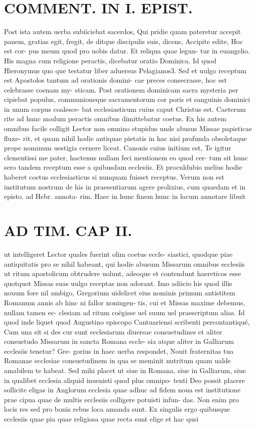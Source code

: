 \documentclass{article}
\begin{document}
\begin{pages}
\section*{COMMENT. IN I. EPIST. }\pstart Post ista autem uerba subiiciebat sacerdos, Qui pridie quam pateretur accepit panem, gratias egit, fregit, de ditque discipulis suis, dicens, Accipite edite, Hoc est cor- pus meum quod pro uobis datur. Et reliqua quae legun- tur in euangelio. His magna cum religione peractis, dicebatur oratio Dominica. Id quod Hieronymus quo que testatur liber  aduersus Pelagianos3. Sed et uulgo receptum est Apostolos tantum ad orationis domini- cae preces consecrasse, hoc est celebrasse coenam my- sticam. Post orationem dominicam sacra mysteria per cipiebat populus, communioneque sacramentorum cor poris et sanguinis dominici in unum corpus coalesce- bat ecclesiasticum cuius caput Christus est. Caeterum rite ad hunc modum peractis omnibus dimittebatur coetus. Ex his autem omnibus facile colligit Lector non omnino stupidus unde abusus Missae papisticae fluxe- rit, et quam nihil hodie antiquae pietatis in hac nisi profunda obsoletaque prope nominum uestigia cernere liceat. Canonis cuius initium est, Te igitur clementissi me pater, hactenus nullam feci mentionem eo quod cer- tum sit hunc sero tandem receptum esse a quibusdam ecclesiis. Et proculdubio melius hodie haberet coetus ecclesiasticus si nunquam fuisset receptus. Verum non est institutum nostrum de his in praesentiarum agere prolixius, cum quaedam et in episto. ad Hebr. annota- rim. Haec in hunc finem hunc in locum annotare libuit  \pend
\section*{AD TIM. CAP II. }
\marginpar{[ p.110 ]}\pstart ut intelligeret Lector quales fuerint olim coetus eccle- siastici, quodque piae antiquitatis pro se nihil habeant, qui hodie abusum Missarum omnibus ecclesiis ut ritum apostolicum obtrudere uolunt, adeoque et contendunt haereticos esse quotquot Missas suas uulgo receptas non adorant. Imo adiicio his quod illis nouum fore nil ambigo, Gregorium uidelicet eius nominis primum antistitem Romanum annis ab hinc ni fallor noningen- tis, cui et Missas maxime debemus, nullam tamen ec- clesiam ad ritum coëgisse uel suum uel praescriptum alias. Id quod inde liquet quod Augustino episcopo Cantuariensi scribenti percontantiqué, Cum una sit si des cur sunt ecclesiarum diuersae consuetudines et aliter consuetudo Missarum in sancta Romana eccle- sia atque aliter in Galliarum ecclesiis tenetur? Gre- gorius in haec uerba respondet, Nouit fraternitas tua Romanae ecclesiae consuetudinem in qua se meminit nutritum quam ualde amabilem te habeat. Sed mihi placet ut siue in Romana, siue in Galliarum, siue in qualibet ecclesia aliquid inuenisti quod plus omnipo- tenti Deo possit placere sollicite eligas in Anglorum ecclesia quae adhuc ad fidem noua est institutione prae cipua quae de multis ecclesiis colligere potuisti infun- das. Non enim pro locis res sed pro bonis rebus loca amanda sunt. Ex singulis ergo quibusque ecclesiis quae pia quae religiosa quae recta sunt elige et hac qusi  \pend

\end{pages}
\end{document}
